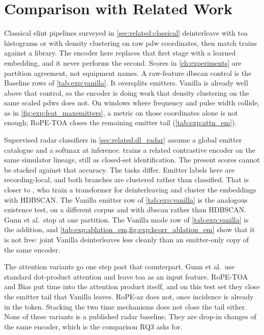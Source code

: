 \section{Comparison with Related Work}\label{sec:disc:comparison}

Classical \gls{elint} pipelines surveyed in \cref{sec:related:classical} deinterleave with \gls{toa} histograms or with density clustering on raw \gls{pdw} coordinates, then match trains against a library.
The encoder here replaces that first stage with a learned embedding, and it never performs the second.
Scores in \cref{ch:experiments} are partition agreement, not equipment names.
A raw-feature \gls{dbscan} control is the Baseline rows of \cref{tab:exp:vanilla}.
It oversplits emitters.
Vanilla is already well above that control, so the encoder is doing work that density clustering on the same scaled \glspl{pdw} does not.
On windows where frequency and pulse width collide, as in \cref{fig:exp:feat_maxemitters}, a metric on those coordinates alone is not enough; RoPE-TOA closes the remaining emitter tail (\cref{tab:exp:attn_em}).

Supervised radar classifiers in \cref{sec:related:dl_radar} assume a global emitter catalogue and a softmax at inference.
\textcite{jonsson2023supcon} trains a related contrastive encoder on the same simulator lineage, still as closed-set identification.
The present scores cannot be stacked against that accuracy. The tasks differ.
Emitter labels here are recording-local, and both branches are clustered rather than classified.
That is closer to \textcite{gunn2025deinterleaving}, who train a transformer for deinterleaving and cluster the embeddings with HDBSCAN.
The Vanilla emitter row of \cref{tab:exp:vanilla} is the analogous existence test, on a different corpus and with \gls{dbscan} rather than HDBSCAN.
Gunn et al.\ stop at one partition. The Vanilla mode row of \cref{tab:exp:vanilla} is the addition, and \cref{tab:exp:ablation_em,fig:exp:kcorr_ablation_em} show that it is not free: joint Vanilla deinterleaves less cleanly than an emitter-only copy of the same encoder.

The attention variants go one step past that counterpart.
Gunn et al.\ use standard dot-product attention and leave \gls{toa} as an input feature.
RoPE-TOA and Bias put time into the attention product itself, and on this test set they close the emitter tail that Vanilla leaves.
RoPE-az does not, once incidence is already in the token.
Stacking the two time mechanisms does not close the tail either.
None of these variants is a published radar baseline. They are drop-in changes of the same encoder, which is the comparison RQ3 asks for.

